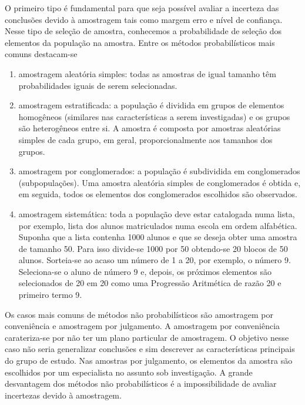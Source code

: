 {O primeiro tipo é fundamental para que seja possível avaliar a incerteza das conclusões devido à amostragem tais como margem erro e nível de confiança.  Nesse tipo de seleção de amostra, conhecemos a probabilidade de seleção dos elementos da população na amostra. Entre os métodos probabilísticos mais comuns destacam-se
\begin{enumerate}
\item {} 
amostragem aleatória simples: todas as amostras de igual tamanho têm probabilidades iguais de serem selecionadas.

\item {} 
amostragem estratificada: a população é dividida em grupos de elementos homogêneos (similares nas características a serem investigadas) e os grupos são heterogêneos entre si. A amostra é composta por amostras aleatórias simples de cada grupo, em geral, proporcionalmente aos tamanhos dos grupos.

\item {} 
amostragem por conglomerados: a população é subdividida em conglomerados (subpopulações). Uma amostra aleatória simples de conglomerados é obtida e, em seguida, todos os elementos dos conglomerados escolhidos são observados.

\item {} 
amostragem sistemática: toda a população deve estar catalogada numa lista, por exemplo, lista dos alunos matriculados numa escola em ordem alfabética. Suponha que a lista contenha 1000 alunos e que se deseja obter uma amostra de tamanho 50. Para isso divide-se 1000 por 50 obtendo-se 20 blocos de 50 alunos. Sorteia-se ao acaso um número de 1 a 20, por exemplo, o número 9. Seleciona-se o aluno de número 9 e, depois, os próximos elementos são selecionados de 20 em 20 como uma Progressão Aritmética de razão 20 e primeiro termo 9.

\end{enumerate}

Os casos mais comuns de métodos não probabilísticos são amostragem por conveniência e amostragem por julgamento. A amostragem por conveniência carateriza-se por não ter um plano particular de amostragem. O objetivo nesse caso não seria generalizar conclusões e sim descrever as características principais do grupo de estudo.  Nas amostras por julgamento, os elementos da amostra são escolhidos por um especialista no assunto sob investigação. A grande desvantagem dos métodos não probabilísticos é a impossibilidade de avaliar incertezas devido à amostragem.

}
